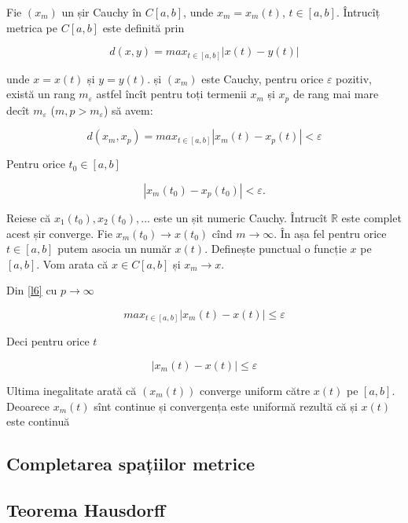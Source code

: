 \documentclass[a4paper,12pt]{article}
\theoremstyle{change}
\newenvironment{proof}{{\bf Demonstrație:} }{}
\begin{document}
\begin{proof}
Fie $(x_m)$ un șir Cauchy în $C[a,b]$, unde $x_m=x_m(t)$, $t\in [a,b]$. Întrucîț metrica pe $C[a,b]$ este definită prin

\[
  d(x,y) = max_{t\in [a,b]} |x(t)-y(t)|
\]

unde $x=x(t)$ și $y=y(t)$.  și $(x_m)$ este Cauchy, pentru orice $\varepsilon$ pozitiv, există un rang $m_{\varepsilon}$ astfel încît pentru toți termenii $x_m$ și $x_p$ de rang mai mare decît $m_{\varepsilon}$ ($m,p>m_{\varepsilon}$) să avem:

\[
\label{l6}
d(x_m,x_p) = max_{t\in [a,b]} |x_m(t)-x_p(t)|<\varepsilon
\]

Pentru orice $t_0\in [a,b]$

\[
|x_m(t_0)-x_p(t_0)|<\varepsilon.
\]

Reiese că $x_1(t_0),x_2(t_0),...$ este un șit numeric Cauchy. Întrucît $\mathbb{R}$ este complet acest șir converge. Fie $x_m(t_0)\to x(t_0)$ cînd $m\to\infty$. În așa fel pentru orice $t\in[a,b]$ putem asocia un număr $x(t)$. Definește punctual o funcție $x$ pe $[a,b]$. Vom arata că $x\in C[a,b]$ și $x_m\to x$.

Din \ref{l6} cu $p\to\infty$

\[
max_{t\in [a,b]} |x_m(t)-x(t)|\leq \varepsilon
\]

Deci pentru orice $t$

\[
|x_m(t)-x(t)|\leq \varepsilon
\]

Ultima inegalitate arată că $(x_m(t))$ converge uniform către $x(t)$ pe $[a,b]$. Deoarece $x_m(t)$ sînt continue și convergența este uniformă rezultă că și $x(t)$ este continuă
\end{proof}



\subsection{Completarea spațiilor metrice}

\subsection{Teorema Hausdorff}
\end{document}
